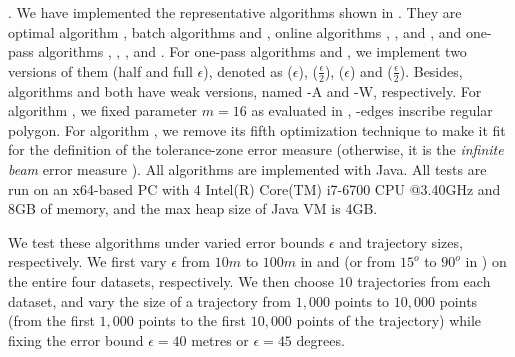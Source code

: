 

.
We have implemented the representative algorithms shown in .
 They are optimal algorithm \opt, batch algorithms \dpa and \tpa, online algorithms  \opwa, \bqsa, \squishe and {\dagots}, and one-pass algorithms  \operb, \siped, \cised, \intersec and \interval.
For one-pass algorithms \siped and \cised, we implement two versions of them (half and full $\epsilon$), denoted as \siped($\epsilon$), \siped($\frac{\epsilon}{2}$), \cised($\epsilon$) and \cised($\frac{\epsilon}{2}$).
{Besides, algorithms \operb\cite{Lin:Operb} and \cised\cite{Lin:Cised} both have weak versions, named \operb-A and \cised-W, respectively.} %
For algorithm \cised, we fixed parameter $m=16$ as evaluated in \cite{Lin:Cised}, -edges inscribe regular polygon.
For algorithm \operb, we remove its fifth optimization technique to make it fit for the definition of the {tolerance-zone error measure \cite{Daescu:metric,Barequet:3D,Chen:Space,Imai:Optimal,Melkman:Optimal} (otherwise, it is the \emph{infinite beam} error measure \cite{Daescu:metric,Chen:Space})}.
All algorithms are implemented with Java.
{All tests are run on an x64-based  PC with 4 Intel(R) Core(TM) {i7-6700 CPU @3.40GHz} and 8GB of memory, and {the max heap size of Java VM is 4GB.}}


We test these algorithms under varied error bounds $\epsilon$ and trajectory sizes, respectively. We first vary $\epsilon$ from $10m$ to $100m$ in \ped and \sed (or from $15^o$ to $90^o$ in \dad) on the entire four datasets, respectively. We then choose $10$ trajectories from each dataset, and vary the size  of a trajectory from $1,000$ points to $10,000$ points {(\ie from the first $1,000$ points to the first $10,000$ points of the trajectory)} while fixing the error bound $\epsilon=40$ metres or $\epsilon=45$ degrees.

